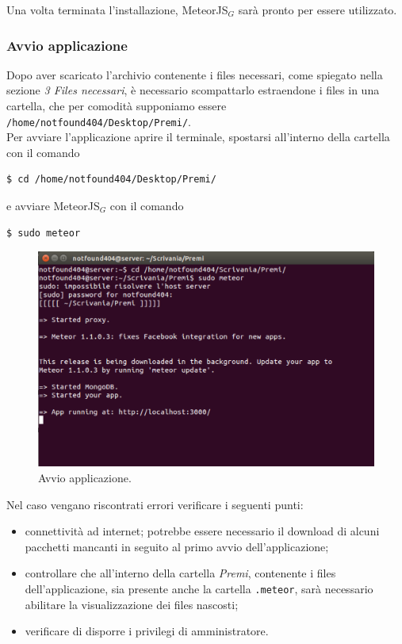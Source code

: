 Una volta terminata l'installazione, MeteorJS$_G$ sarà pronto per essere utilizzato.

\subsubsection{Avvio applicazione}
Dopo aver scaricato l'archivio contenente i files necessari, come spiegato nella sezione \emph{3 Files necessari}, è necessario scompattarlo estraendone i files in una cartella, che per comodità supponiamo essere \verb+/home/notfound404/Desktop/Premi/+.\\
Per avviare l'applicazione aprire il terminale, spostarsi all'interno della cartella con il comando

\begin{lstlisting}[style=DOS]
	$ cd /home/notfound404/Desktop/Premi/
\end{lstlisting}

\noindent e avviare MeteorJS$_G$ con il comando 

\begin{lstlisting}[style=DOS]
	$ sudo meteor
\end{lstlisting}

\begin{figure}[!h]
\begin{center}
\includegraphics[scale=0.4]{img/start_premi.png}
\caption{Avvio applicazione.}
\end{center}
\end{figure}

\newpage
Nel caso vengano riscontrati errori verificare i seguenti punti:
\begin{itemize}
\item connettività ad internet; potrebbe essere necessario il download di alcuni pacchetti mancanti in seguito al primo avvio dell'applicazione;
\item controllare che all'interno della cartella \emph{Premi}, contenente i files dell'applicazione, sia presente anche la cartella \verb+.meteor+, sarà necessario abilitare la visualizzazione dei files nascosti;
\item verificare di disporre i privilegi di amministratore.
\end{itemize}

